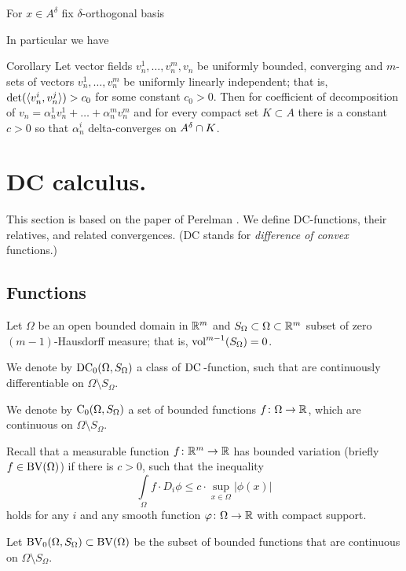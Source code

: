 For $x\in A^\delta$ fix $\delta$-orthogonal basis





In particular we have
\begin{thm}{Corollary}\label{cor:cdeltacoeff}
Let vector fields $v_n^1,\dots, v_n^m, v_n$ be
uniformly bounded, converging
 and $m$-sets of vectors
$v_n^1,\dots, v_n^m$ be uniformly linearly independent;
that is, $\det(\langle v_n^i, v_n^j\rangle)>c_0$
for some constant $c_0>0$.
Then for coefficient of decomposition
of $v_n=\alpha_n^1 v_n^1+\dots+\alpha_n^m v_n^m$
 and for every compact
set $K\subset A$ there is a constant $c>0$ so that
$\alpha_n^i$ delta-converges on $A^\delta\cap K$.
\end{thm}

\section{DC calculus.}\label{sec:DC}

This section is based on the paper of Perelman \cite{PerDC}.
We define DC-functions, their relatives, and related convergences.
(DC stands for \emph{difference of convex} functions.)

\subsection{Functions}

Let $\Omega$ be an open bounded domain in $\mathbb{R}^m$
and $S_\Omega\subset\Omega\subset\mathbb{R}^m $ subset of
zero $(m-1)$-Hausdorff measure; that is, $\operatorname{vol}^{m-1}(S_\Omega)=0$.

We denote by  $\operatorname{DC_0}(\Omega,S_\Omega)$ a class of
 $\mathrm{DC\,}$-function, such  that are continuously differentiable on
$\Omega\setminus S_\Omega$.

We denote by $\operatorname{C_0}(\Omega,S_\Omega)$ a set of bounded functions
$f\colon\Omega\to\mathbb{R}$, which are continuous on $\Omega\setminus S_\Omega$.

Recall that a measurable function $f\colon\mathbb{R}^m\to \mathbb{R}$ has bounded variation
 (briefly $f\in\operatorname{BV}(\Omega)$) if there is  $c>0$,
such that  the inequality
$$\int\limits_\Omega f\cdot D_i\phi
\le
 c\cdot\sup_{x\in\Omega}|\phi(x)|$$
holds
for any $i$ and any smooth function $\varphi\colon\Omega\to \mathbb{R}$ with compact support.

Let $\operatorname{BV_0}(\Omega,S_\Omega)\subset \operatorname{BV}(\Omega)$ be the subset of bounded functions that are continuous on $\Omega\setminus S_\Omega$.


